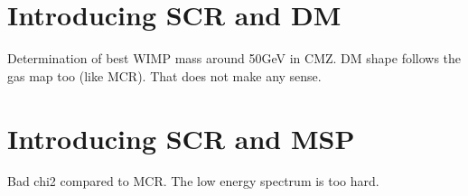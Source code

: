\section{Introducing SCR and DM}
Determination of best WIMP mass around 50GeV in CMZ.
DM shape follows the gas map too (like MCR). That does not make any sense.



\section{Introducing SCR and MSP}

Bad chi2 compared to MCR. The low energy spectrum is too hard.






